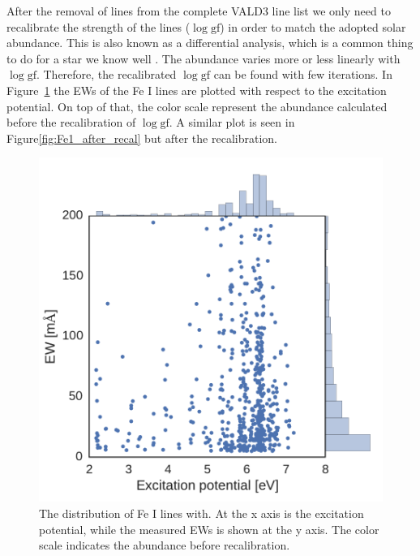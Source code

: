 \documentclass{aa}
\begin{document}
After the removal of lines from the complete VALD3 line list we only
need to recalibrate the strength of the lines ($\log \mathrm{gf}$) in
order to match the adopted solar abundance. This is also known as a
differential analysis, which is a common thing to do for a star we know
well \citep{Onehag2012}. The abundance varies more or less linearly
with $\log \mathrm{gf}$. Therefore, the recalibrated $\log \mathrm{gf}$
can be found with few iterations. In Figure~\ref{fig:Fe1_before_recal}
the EWs of the Fe I lines are plotted with respect to the excitation
potential. On top of that, the color scale represent the abundance
calculated before the recalibration of $\log \mathrm{gf}$. A similar
plot is seen in Figure\ref{fig:Fe1_after_recal} but after the
recalibration.

\begin{figure}[tpb]
    \centering
    \includegraphics[width=0.9\linewidth]{figures/EWvsEP.pdf}
    \caption{The distribution of Fe I lines with. At the x axis is the
    excitation potential, while the measured EWs is shown at the y axis. The
    color scale indicates the abundance before recalibration.}
    \label{fig:Fe1_before_recal}
\end{figure}
\end{document}

